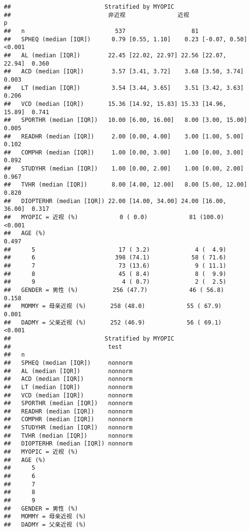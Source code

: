 \documentclass[]{ctexbook}
\begin{document}
\begin{verbatim}
##                           Stratified by MYOPIC
##                            非近视               近视                 p     
##   n                          537                   81                      
##   SPHEQ (median [IQR])      0.79 [0.55, 1.10]    0.23 [-0.07, 0.50]  <0.001
##   AL (median [IQR])        22.45 [22.02, 22.97] 22.56 [22.07, 22.94]  0.360
##   ACD (median [IQR])        3.57 [3.41, 3.72]    3.68 [3.50, 3.74]    0.003
##   LT (median [IQR])         3.54 [3.44, 3.65]    3.51 [3.42, 3.63]    0.206
##   VCD (median [IQR])       15.36 [14.92, 15.83] 15.33 [14.96, 15.89]  0.741
##   SPORTHR (median [IQR])   10.00 [6.00, 16.00]   8.00 [3.00, 15.00]   0.005
##   READHR (median [IQR])     2.00 [0.00, 4.00]    3.00 [1.00, 5.00]    0.102
##   COMPHR (median [IQR])     1.00 [0.00, 3.00]    1.00 [0.00, 3.00]    0.892
##   STUDYHR (median [IQR])    1.00 [0.00, 2.00]    1.00 [0.00, 2.00]    0.967
##   TVHR (median [IQR])       8.00 [4.00, 12.00]   8.00 [5.00, 12.00]   0.820
##   DIOPTERHR (median [IQR]) 22.00 [14.00, 34.00] 24.00 [16.00, 36.00]  0.317
##   MYOPIC = 近视 (%)            0 ( 0.0)            81 (100.0)        <0.001
##   AGE (%)                                                             0.497
##      5                        17 ( 3.2)             4 (  4.9)              
##      6                       398 (74.1)            58 ( 71.6)              
##      7                        73 (13.6)             9 ( 11.1)              
##      8                        45 ( 8.4)             8 (  9.9)              
##      9                         4 ( 0.7)             2 (  2.5)              
##   GENDER = 男性 (%)          256 (47.7)            46 ( 56.8)         0.158
##   MOMMY = 母亲近视 (%)       258 (48.0)            55 ( 67.9)         0.001
##   DADMY = 父亲近视 (%)       252 (46.9)            56 ( 69.1)        <0.001
##                           Stratified by MYOPIC
##                            test   
##   n                               
##   SPHEQ (median [IQR])     nonnorm
##   AL (median [IQR])        nonnorm
##   ACD (median [IQR])       nonnorm
##   LT (median [IQR])        nonnorm
##   VCD (median [IQR])       nonnorm
##   SPORTHR (median [IQR])   nonnorm
##   READHR (median [IQR])    nonnorm
##   COMPHR (median [IQR])    nonnorm
##   STUDYHR (median [IQR])   nonnorm
##   TVHR (median [IQR])      nonnorm
##   DIOPTERHR (median [IQR]) nonnorm
##   MYOPIC = 近视 (%)               
##   AGE (%)                         
##      5                            
##      6                            
##      7                            
##      8                            
##      9                            
##   GENDER = 男性 (%)               
##   MOMMY = 母亲近视 (%)            
##   DADMY = 父亲近视 (%)
\end{verbatim}
\end{document}
